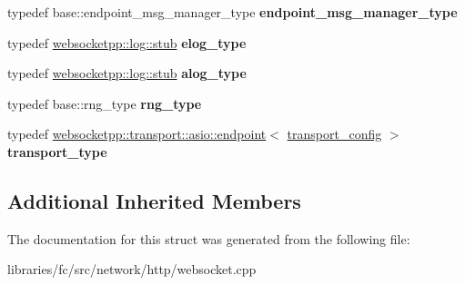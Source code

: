 \begin{DoxyCompactItemize}
typedef base\+::endpoint\+\_\+msg\+\_\+manager\+\_\+type {\bfseries endpoint\+\_\+msg\+\_\+manager\+\_\+type}
\item 
\mbox{\label{structfc_1_1http_1_1detail_1_1asio__tls__stub__log_a1ed2870e6102356510d53bc1410b2a18}} 
typedef \mbox{\hyperlink{classwebsocketpp_1_1log_1_1stub}{websocketpp\+::log\+::stub}} {\bfseries elog\+\_\+type}
\item 
\mbox{\label{structfc_1_1http_1_1detail_1_1asio__tls__stub__log_ab44b7a9c2a1a60f99663f12eb59b6b07}} 
typedef \mbox{\hyperlink{classwebsocketpp_1_1log_1_1stub}{websocketpp\+::log\+::stub}} {\bfseries alog\+\_\+type}
\item 
\mbox{\label{structfc_1_1http_1_1detail_1_1asio__tls__stub__log_a7f75855630811b4564a8bc11764cf49b}} 
typedef base\+::rng\+\_\+type {\bfseries rng\+\_\+type}
\item 
\mbox{\label{structfc_1_1http_1_1detail_1_1asio__tls__stub__log_a88e4c454cc1aa0b339c8674b39be6e2f}} 
typedef \mbox{\hyperlink{classwebsocketpp_1_1transport_1_1asio_1_1endpoint}{websocketpp\+::transport\+::asio\+::endpoint}}$<$ \mbox{\hyperlink{structfc_1_1http_1_1detail_1_1asio__tls__stub__log_1_1transport__config}{transport\+\_\+config}} $>$ {\bfseries transport\+\_\+type}
\end{DoxyCompactItemize}
\subsection*{Additional Inherited Members}


The documentation for this struct was generated from the following file\+:\begin{DoxyCompactItemize}
\item 
libraries/fc/src/network/http/websocket.\+cpp\end{DoxyCompactItemize}
